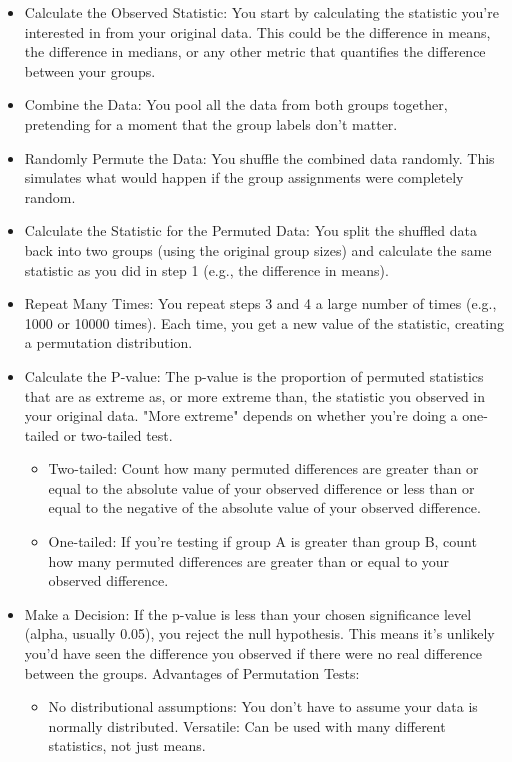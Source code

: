 \documentclass[11pt]{article}
\begin{document}
\begin{itemize}
 \item Calculate the Observed Statistic: You start by calculating the statistic you're interested in from your original data.  This could be the difference in means, the difference in medians, or any other metric that quantifies the difference between your groups.
 \item Combine the Data: You pool all the data from both groups together, pretending for a moment that the group labels don't matter.
 \item Randomly Permute the Data: You shuffle the combined data randomly.  This simulates what would happen if the group assignments were completely random.
 \item Calculate the Statistic for the Permuted Data: You split the shuffled data back into two groups (using the original group sizes) and calculate the same statistic as you did in step 1 (e.g., the difference in means).
 \item Repeat Many Times: You repeat steps 3 and 4 a large number of times (e.g., 1000 or 10000 times). Each time, you get a new value of the statistic, creating a permutation distribution.
 \item Calculate the P-value: The p-value is the proportion of permuted statistics that are as extreme as, or more extreme than, the statistic you observed in your original data. "More extreme" depends on whether you're doing a one-tailed or two-tailed test.
 \begin{itemize}
      \item Two-tailed:  Count how many permuted differences are greater than or equal to the absolute value of your observed difference or less than or equal to the negative of the absolute value of your observed difference.
      \item One-tailed: If you're testing if group A is greater than group B, count how many permuted differences are greater than or equal to your observed difference.
 \end{itemize}
 \item Make a Decision: If the p-value is less than your chosen significance level (alpha, usually 0.05), you reject the null hypothesis.  This means it's unlikely you'd have seen the difference you observed if there were no real difference between the groups.
 Advantages of Permutation Tests:
 \begin{itemize}
     \item No distributional assumptions: You don't have to assume your data is normally distributed.
 Versatile: Can be used with many different statistics, not just means.

\end{itemize}
\end{itemize}
\end{document}
